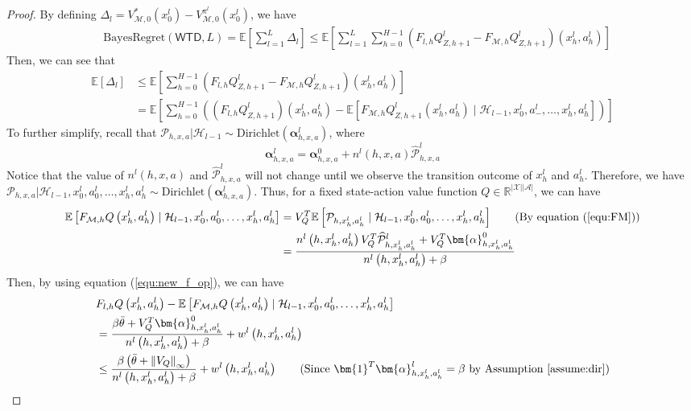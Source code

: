 \documentclass[letterpaper]{article} %
\newcommand{\Sp}[1]{\left(#1\right)}
\newcommand{\Mp}[1]{\left[#1\right]}
\newcommand{\abs}[1]{\left|#1\right|}
\newcommand{\Norm}[1]{\left\|#1\right\|}
\newcommand{\E}{\mathbb{E}}
\newcommand{\R}{\mathbb{R}}
\newcommand{\M}{\mathcal{M}}
\newcommand{\aX}{\abs{\mathcal{X}}}
\newcommand{\aA}{\abs{\mathcal{A}}}
\newcommand{\hatp}{\widehat{\mathcal{P}}}
\theoremstyle{definition}
\begin{document}
\begin{proof}
    By defining $\Delta_l=V^*_{\M, 0}\Sp{x_0^l}-V^{\pi^l}_{\M, 0}\Sp{x_0^l}$, we have
\begin{align*}
    &\mathrm{BayesRegret}\Sp{\mathsf{WTD}, L}=\E\Mp{\sum_{l=1}^{L}\Delta_l}\leq\E\Mp{\sum_{l=1}^{L}\sum_{h=0}^{H-1}\Sp{F_{l, h}Q^l_{Z, h+1}-F_{\M, h}Q^l_{Z, h+1}}\Sp{x_h^l, a_h^l}}
\end{align*}
Then, we can see that
\begin{align*}
    \E\Mp{\Delta_l}&\leq \E\Mp{\sum_{h=0}^{H-1}\Sp{F_{l, h}Q^l_{Z, h+1}-F_{\M, h}Q^l_{Z, h+1}}\Sp{x_h^l, a_h^l}}\\
    &=\E\Mp{\sum_{h=0}^{H-1}\Sp{\Sp{F_{l, h}Q_{Z, h+1}^l}\Sp{x_h^l, a_h^t}-\E\Mp{F_{\M, h}Q^l_{Z, h+1}\Sp{x_h^l, a_h^l}\mid \mathcal{H}_{l-1}, x_0^l, a_-^l, \dots, x_h^l, a_h^l}}}
\end{align*}
To further simplify, recall that $\mathcal{P}_{h, x, a}|\mathcal{H}_{l-1}\sim\text{Dirichlet}\Sp{\bm{\alpha}^l_{h, x, a}}$, where
\begin{equation*}
    \bm{\alpha}^l_{h, x, a}=\bm{\alpha}^0_{h, x, a}+n^l\Sp{h, x, a}\hatp^l_{h, x, a}
\end{equation*}
Notice that the value of $n^l\Sp{h, x, a}$ and $\hatp^l_{h, x, a}$ will not change until we observe the transition outcome of $x_h^l$ and $a_h^l$. Therefore, we have $\mathcal{P}_{h, x, a}|\mathcal{H}_{l-1}, x_0^l, a_0^l, \dots, x_h^l, a_h^l\sim\text{Dirichlet}\Sp{\bm{\alpha}^l_{h, x, a}}$. Thus, for a fixed state-action value function $Q\in\R^{\aX\aA}$, we can have
\begin{align*}
    \E\Mp{F_{\M, h}Q\Sp{x_h^l, a_h^l}\mid\mathcal{H}_{l-1}, x_0^l, a_0^l, \dots, x_h^l, a_h^l}&=V_Q^T\E\Mp{\mathcal{P}_{h, x_h^l, a_h^l}\mid \mathcal{H}_{l-1}, x_0^l, a_0^l, \dots, x_h^l, a_h^l}\tag{By equation (\ref{equ:FM})}\\
    &=\frac{n^l\Sp{h, x_h^l, a_h^l}V_Q^T\hatp^l_{h, x_h^l, a_h^l}+V_Q^T\bm{\alpha}^0_{h, x_h^l, a_h^l}}{n^l\Sp{h, x_h^l, a_h^l}+\beta}
\end{align*}
Then, by using equation (\ref{equ:new_f_op}), we can have
\begin{align*}
    &F_{l, h}Q\Sp{x_h^l, a_h^l}-\E\Mp{F_{\M, h}Q\Sp{x_h^l, a_h^l}\mid\mathcal{H}_{l-1}, x_0^l, a_0^l, \dots, x_h^l, a_h^l}\\
    &=\frac{\beta\bar{\theta}+V_Q^T\bm{\alpha}^0_{h, x_h^l, a_h^l}}{n^l\Sp{h, x_h^l, a_h^l}+\beta}+w^l\Sp{h, x_h^l, a_h^l}\\
    &\leq\frac{\beta\Sp{\bar{\theta}+\Norm{V_Q}_{\infty}}}{n^l\Sp{h, x_h^l, a_h^l}+\beta}+w^l\Sp{h, x_h^l, a_h^l}\tag{Since $\bm{1}^T\bm{\alpha}^l_{h, x_h^l, a_h^l} = \beta$ by Assumption \ref{assume:dir}}

\end{align*}
\end{proof}
\end{document}

